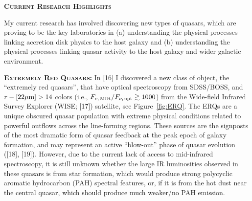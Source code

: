 \documentclass[oneside, a4paper, onecolumn, 11pt]{article}
\begin{document}
\medskip 
\medskip
\noindent
{\bfseries \large \textsc{\textcolor{Cerulean}{Current Research Highlights}}}

\smallskip
\smallskip
\noindent
My current research has involved discovering new types of quasars,
which are proving to be the key laboratories in (a) understanding the
physical processes linking accretion disk physics to the host galaxy
and (b) understanding the physical processes linking quasar activity
to the host galaxy and wider galactic environment.


\smallskip \smallskip
\smallskip
\smallskip
\noindent
\textbf{\textsc{Extremely Red Quasars:}}
In [16] I discovered a new class of object, the ``extremely red
quasars'', that have optical spectroscopy from SDSS/BOSS, and
$r-[22\mu{\rm m}]>14$ colors (i.e., $F_{\nu,\, {\rm MIR}} / F_{\nu,\,
{\rm opt}} \gtrsim 1000$) from the Wide-field Infrared Survey Explorer
(WISE; [17]) satellite, see Figure~\ref{fig:ERQ}.  The ERQs are a
unique obscured quasar population with extreme physical conditions
related to powerful outflows across the line-forming regions. These
sources are the signposts of the most dramatic form of quasar feedback
at the peak epoch of galaxy formation, and may represent an active
``blow-out'' phase of quasar evolution ([18], [19]).  However, due to
the current lack of access to mid-infrared spectroscopy, it is still
unknown whether the large IR luminosities observed in these quasars is
from star formation, which would produce strong polycyclic aromatic
hydrocarbon (PAH) spectral features, or, if it is from the hot dust
near the central quasar, which should produce much weaker/no PAH
emission.
\end{document}
